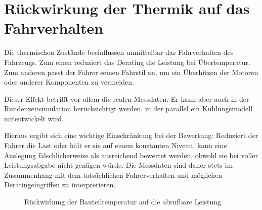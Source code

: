 \section{Rückwirkung der Thermik auf das Fahrverhalten}
\label{sec:rueckwirkung}

Die thermischen Zustände beeinflussen unmittelbar das Fahrverhalten des
Fahrzeugs. Zum einen reduziert das Derating die Leistung bei Übertemperatur.
Zum anderen passt der Fahrer seinen Fahrstil an, um ein Überhitzen der Motoren
oder anderer Komponenten zu vermeiden.

Dieser Effekt betrifft vor allem die realen Messdaten. Er kann aber auch in
der Rundenzeitsimulation berücksichtigt werden, in der parallel ein
Kühlungsmodell mitentwickelt wird.

Hieraus ergibt sich eine wichtige Einschränkung bei der Bewertung: Reduziert
der Fahrer die Last oder hält er sie auf einem konstanten Niveau, kann eine
Auslegung fälschlicherweise als ausreichend bewertet werden, obwohl sie bei
voller Leistungsabgabe nicht genügen würde. Die Messdaten sind daher stets im
Zusammenhang mit dem tatsächlichen Fahrerverhalten und möglichen
Deratingeingriffen zu interpretieren.

\begin{figure}[htbp]
    \centering
    \caption{Rückwirkung der Bauteiltemperatur auf die abrufbare Leistung}
    \label{fig:rueckwirkung}
\end{figure}
